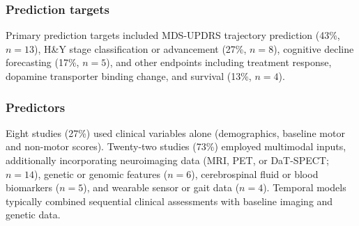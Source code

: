 \documentclass[11pt,a4paper]{article}
\begin{document}
\subsubsection{Prediction targets}
Primary prediction targets included MDS-UPDRS trajectory prediction (43\%, $n=13$), H\&Y stage classification or advancement (27\%, $n=8$), cognitive decline forecasting (17\%, $n=5$), and other endpoints including treatment response, dopamine transporter binding change, and survival (13\%, $n=4$).

\subsubsection{Predictors}
Eight studies (27\%) used clinical variables alone (demographics, baseline motor and non-motor scores). Twenty-two studies (73\%) employed multimodal inputs, additionally incorporating neuroimaging data (MRI, PET, or DaT-SPECT; $n=14$), genetic or genomic features ($n=6$), cerebrospinal fluid or blood biomarkers ($n=5$), and wearable sensor or gait data ($n=4$). Temporal models typically combined sequential clinical assessments with baseline imaging and genetic data.
\end{document}
